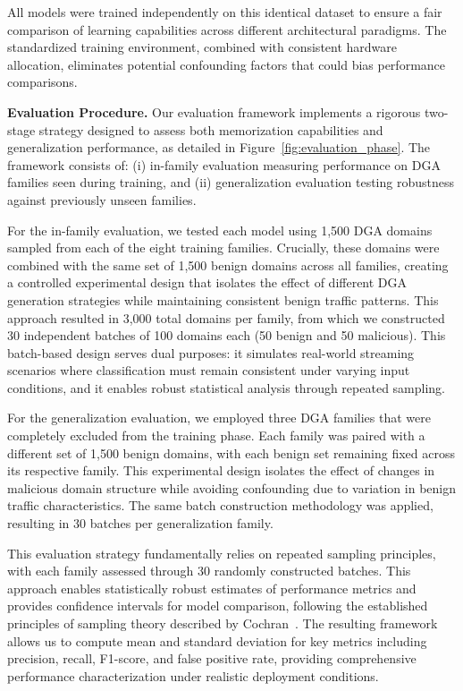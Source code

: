 \documentclass[a4paper]{llncs}
\begin{document}
All models were trained independently on this identical dataset to ensure a fair comparison of learning capabilities across different architectural paradigms. The standardized training environment, combined with consistent hardware allocation, eliminates potential confounding factors that could bias performance comparisons.

\textbf{Evaluation Procedure.} Our evaluation framework implements a rigorous two-stage strategy designed to assess both memorization capabilities and generalization performance, as detailed in Figure~\ref{fig:evaluation_phase}. The framework consists of: (i) in-family evaluation measuring performance on DGA families seen during training, and (ii) generalization evaluation testing robustness against previously unseen families.

For the in-family evaluation, we tested each model using 1,500 DGA domains sampled from each of the eight training families. Crucially, these domains were combined with the same set of 1,500 benign domains across all families, creating a controlled experimental design that isolates the effect of different DGA generation strategies while maintaining consistent benign traffic patterns. This approach resulted in 3,000 total domains per family, from which we constructed 30 independent batches of 100 domains each (50 benign and 50 malicious). This batch-based design serves dual purposes: it simulates real-world streaming scenarios where classification must remain consistent under varying input conditions, and it enables robust statistical analysis through repeated sampling.

For the generalization evaluation, we employed three DGA families that were completely excluded from the training phase. Each family was paired with a different set of 1,500 benign domains, with each benign set remaining fixed across its respective family. This experimental design isolates the effect of changes in malicious domain structure while avoiding confounding due to variation in benign traffic characteristics. The same batch construction methodology was applied, resulting in 30 batches per generalization family.

This evaluation strategy fundamentally relies on repeated sampling principles, with each family assessed through 30 randomly constructed batches. This approach enables statistically robust estimates of performance metrics and provides confidence intervals for model comparison, following the established principles of sampling theory described by Cochran~\cite{cochran1977sampling}. The resulting framework allows us to compute mean and standard deviation for key metrics including precision, recall, F1-score, and false positive rate, providing comprehensive performance characterization under realistic deployment conditions.
\end{document}
